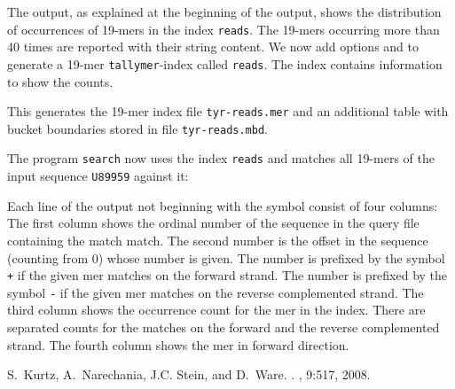 \documentclass[12pt]{article}
\newcommand{\Programname}[1]{\texttt{\small #1}}
\newcommand{\Tallymer}[0]{\Programname{tallymer}\xspace}
\newcommand{\TYsearch}[0]{\Programname{search}\xspace}
\begin{document}
The output, as explained at the beginning of the output, shows the
distribution of occurrences of 19-mers in the index
\texttt{reads}. The 19-mers occurring more 
than 40 times are reported with their string content.
We now add options  and  to 
generate a 19-mer \Tallymer-index called \texttt{reads}. The index contains
information to show the counts.


This generates the 19-mer index file \texttt{tyr-reads.mer} and an additional
table with bucket boundaries stored in file \texttt{tyr-reads.mbd}.

The program \TYsearch now uses the index \texttt{reads} and
matches all 19-mers of the input sequence \texttt{U89959} against it:


Each line of the output not beginning with the symbol \texttt{}
consist of four columns: The first column shows the ordinal number of the
sequence in the query file containing the match match. The second number
is the offset in the sequence (counting from 0) whose number is given.
The number is prefixed by the symbol \texttt{+} if the given mer
matches on the forward strand.
The number is prefixed by the symbol \texttt{-} if the given mer
matches on the reverse complemented strand. The third column shows
the occurrence count for the mer in the index. There are separated 
counts for the matches on the forward and the reverse complemented strand.
The fourth column shows the mer in forward direction. 
%
%
\begin{thebibliography}{1}
S.~Kurtz, A.~Narechania, J.C. Stein, and D.~Ware.
.
, 9:517, 2008.
\end{thebibliography}
\end{document}
